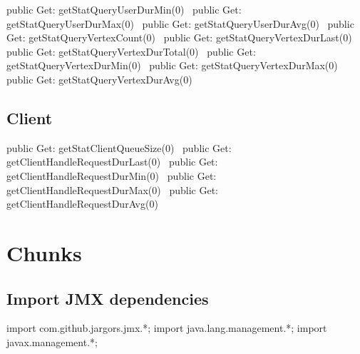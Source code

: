 public \LA{}Get: getStatQueryUserDurMin(0)~{\nwtagstyle{}}\RA{}
public \LA{}Get: getStatQueryUserDurMax(0)~{\nwtagstyle{}}\RA{}
public \LA{}Get: getStatQueryUserDurAvg(0)~{\nwtagstyle{}}\RA{}
public \LA{}Get: getStatQueryVertexCount(0)~{\nwtagstyle{}}\RA{}
public \LA{}Get: getStatQueryVertexDurLast(0)~{\nwtagstyle{}}\RA{}
public \LA{}Get: getStatQueryVertexDurTotal(0)~{\nwtagstyle{}}\RA{}
public \LA{}Get: getStatQueryVertexDurMin(0)~{\nwtagstyle{}}\RA{}
public \LA{}Get: getStatQueryVertexDurMax(0)~{\nwtagstyle{}}\RA{}
public \LA{}Get: getStatQueryVertexDurAvg(0)~{\nwtagstyle{}}\RA{}
\nwendcode{}\nwdocspar

\subsection{Client}
\nwenddocs{}\plusendmoddef
public \LA{}Get: getStatClientQueueSize(0)~{\nwtagstyle{}}\RA{}
public \LA{}Get: getClientHandleRequestDurLast(0)~{\nwtagstyle{}}\RA{}
public \LA{}Get: getClientHandleRequestDurMin(0)~{\nwtagstyle{}}\RA{}
public \LA{}Get: getClientHandleRequestDurMax(0)~{\nwtagstyle{}}\RA{}
public \LA{}Get: getClientHandleRequestDurAvg(0)~{\nwtagstyle{}}\RA{}
\nwendcode{}\nwdocspar

\section{Chunks}
\subsection{Import JMX dependencies}
\nwenddocs{}\endmoddef{}
import com.github.jargors.jmx.*;
import java.lang.management.*;
import javax.management.*;
\nwendcode{}\nwdocspar

